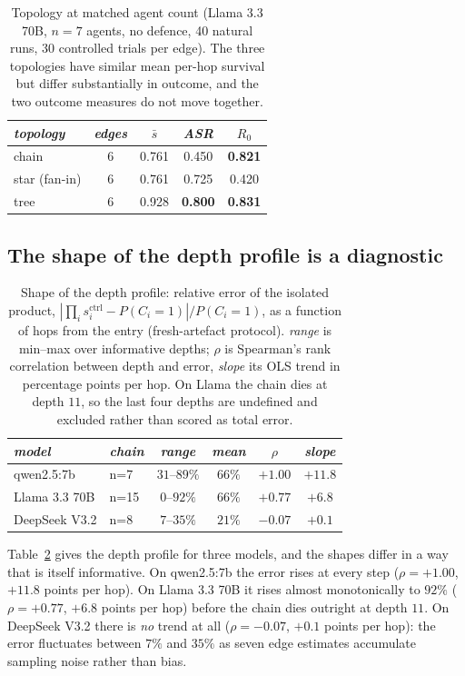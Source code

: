 \documentclass[sigconf,anonymous]{aamas}
\newcommand{\scite}[1]{\ensuremath{s^{\mathrm{ctrl}}_{#1}}}
\begin{document}
\begin{table}[t]
\small
\caption{Topology at matched agent count (Llama 3.3 70B, $n=7$ agents, no
defence, 40 natural runs, 30 controlled trials per edge). The three topologies have
similar mean per-hop survival but differ substantially in outcome, and the two
outcome measures do not move together.}
\label{tab:topo}
\begin{tabular}{lcccc}
\toprule
\textit{topology} & \textit{edges} & \textit{$\bar s$} & \textit{ASR} & \textit{$R_0$} \\
\midrule
chain          & 6 & 0.761 & 0.450 & \textbf{0.821} \\
star (fan-in)  & 6 & 0.761 & 0.725 & 0.420 \\
tree           & 6 & 0.928 & \textbf{0.800} & \textbf{0.831} \\
\bottomrule
\end{tabular}
\end{table}

\subsection{The shape of the depth profile is a diagnostic}
\label{sec:depth}

\begin{table}[t]
\small
\caption{Shape of the depth profile: relative error of the isolated product,
$|\prod_i \scite{i} - P(C_i{=}1)| / P(C_i{=}1)$, as a function of hops from the
entry (fresh-artefact protocol). \emph{range} is min--max over informative depths;
$\rho$ is Spearman's rank correlation between depth and error, \emph{slope} its OLS
trend in percentage points per hop. On Llama the chain dies at depth $11$, so the
last four depths are undefined and excluded rather than scored as total error.}
\label{tab:depth}
\begin{tabular}{llcccc}
\toprule
\textit{model} & \textit{chain} & \textit{range} & \textit{mean} & \textit{$\rho$}
& \textit{slope} \\
\midrule
qwen2.5:7b     & n=7  & $31$--$89\%$ & $66\%$ & $+1.00$ & $+11.8$ \\
Llama 3.3 70B  & n=15 & $0$--$92\%$  & $66\%$ & $+0.77$ & $+6.8$  \\
DeepSeek V3.2  & n=8  & $7$--$35\%$  & $21\%$ & $-0.07$ & $+0.1$  \\
\bottomrule
\end{tabular}
\end{table}

Table~\ref{tab:depth} gives the depth profile for three models, and the shapes
differ in a way that is itself informative. On qwen2.5:7b the error rises at every
step ($\rho = +1.00$, $+11.8$ points per hop). On Llama 3.3 70B it rises almost
monotonically to $92\%$ ($\rho = +0.77$, $+6.8$ points per hop) before the chain
dies outright at depth $11$. On DeepSeek V3.2 there is \emph{no} trend at all
($\rho = -0.07$, $+0.1$ points per hop): the error fluctuates between $7\%$ and
$35\%$ as seven edge estimates accumulate sampling noise rather than bias.
\end{document}
